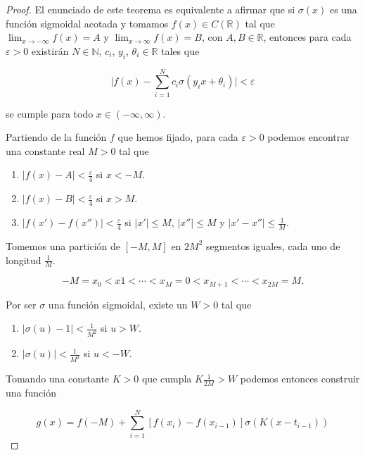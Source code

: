 \begin{proof}

El enunciado de este teorema es equivalente a afirmar que si $\sigma(x)$ es una función sigmoidal acotada y tomamos $f(x)\in C(\mathds{R})$ tal que $\lim_{x\to -\infty}f(x) = A $ y $\lim_{x\to\infty}f(x) = B$, con $A,B\in\mathds{R}$, entonces para cada $\varepsilon >0$ existirán $N\in\mathds{N}$, $c_{i}$, $y_{i}$, $\theta_{i}\in\mathds{R}$ tales que

\begin{equation}
\vert f(x) - \sum_{i=1}^{N}c_{i}\sigma(y_{i}x+\theta_{i}) \vert < \varepsilon
\end{equation}

se cumple para todo $x\in(-\infty,\infty)$. 
 
Partiendo de la función $f$ que hemos fijado, para cada 
$\varepsilon > 0$
 podemos encontrar una constante real $M>0$ tal que
\begin{enumerate}
 	\item $\vert f(x) - A\vert < \frac{\varepsilon}{4}$ si $x<-M$. 
 	\item $\vert f(x) - B\vert < \frac{\varepsilon}{4}$ si $x>M$. 
 	\item $\vert f(x') - f(x'')\vert < \frac{\varepsilon}{4}$ si $\vert x'\vert \leq M$, $\vert x''\vert \leq M$  y $\vert x'-x''\vert \leq \frac{1}{M}$. 

\end{enumerate}
 
Tomemos una partición de $[-M,M]$ en $2M^{2}$ segmentos iguales, cada uno de longitud $\frac{1}{M}$.

\begin{equation}
-M=x_{0}<x{1}<\cdots<x_{M}=0<x_{M+1}<\cdots<x_{2M}=M.
\end{equation}

Por ser $\sigma$ una función sigmoidal, existe un $W>0$ tal que
\begin{enumerate}
 \item $\vert \sigma (u) -1\vert < \frac{1}{M^{2}}$ si $u>W$.
 \item $\vert \sigma (u)\vert < \frac{1}{M^{2}}$ si $u<-W$. 
\end{enumerate}

Tomando una constante $K>0$ que cumpla $K\frac{1}{2M}>W$ podemos entonces construir una función

\begin{equation}\label{eq:id06}
g(x) = f(-M) + \sum^{N}_{i=1} [f(x_{i})-f(x_{i-1})]\sigma (K(x-t_{i-1}))
\end{equation}


\end{proof}
